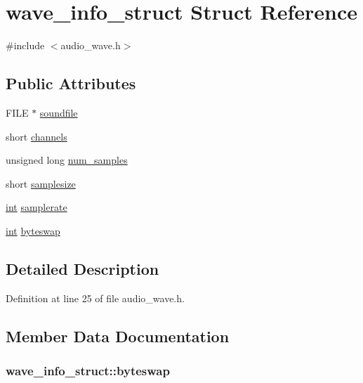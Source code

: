 \hypertarget{structwave__info__struct}{}\section{wave\+\_\+info\+\_\+struct Struct Reference}
\label{structwave__info__struct}


{\ttfamily \#include $<$audio\+\_\+wave.\+h$>$}

\subsection*{Public Attributes}
\begin{DoxyCompactItemize}
\item 
F\+I\+LE $\ast$ \hyperlink{structwave__info__struct_a923e37e26119539af7d973dba3cd9140}{soundfile}
\item 
short \hyperlink{structwave__info__struct_a7eb1e21540aff20dae3ef6a212d4db18}{channels}
\item 
unsigned long \hyperlink{structwave__info__struct_a51d3485507892fe35d23abcdb961db36}{num\+\_\+samples}
\item 
short \hyperlink{structwave__info__struct_a00bacff2a6bca20e7b0833aa5a4acce8}{samplesize}
\item 
\hyperlink{xmltok_8h_a5a0d4a5641ce434f1d23533f2b2e6653}{int} \hyperlink{structwave__info__struct_a9f2422fb5acbde06cacf6bd1799deb37}{samplerate}
\item 
\hyperlink{xmltok_8h_a5a0d4a5641ce434f1d23533f2b2e6653}{int} \hyperlink{structwave__info__struct_a812c12ae73feb635976884254b9ee5c7}{byteswap}
\end{DoxyCompactItemize}


\subsection{Detailed Description}


Definition at line 25 of file audio\+\_\+wave.\+h.



\subsection{Member Data Documentation}
\subsubsection[{\texorpdfstring{byteswap}{byteswap}}]{ wave\+\_\+info\+\_\+struct\+::byteswap}\hypertarget{structwave__info__struct_a812c12ae73feb635976884254b9ee5c7}{}\label{structwave__info__struct_a812c12ae73feb635976884254b9ee5c7}



